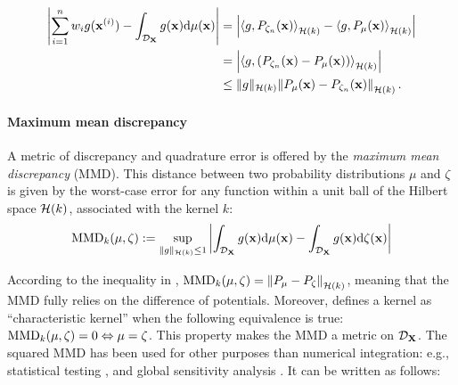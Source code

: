 \begin{subequations}
\begin{align}
    \left| \sum_{i=1}^{n} w_i g({\bf x}^{(i)}) - \int_{\mathcal{D}_{{\bf X}}} g({\bf x}) \mathrm{d} \mu({\bf x}) \right| &= \left| \left\langle g, P_{\zeta_n}({\bf x}) \right\rangle_{\mathcal{H}(k)} - \left\langle g, P_{\mu}({\bf x}) \right\rangle_{\mathcal{H}(k)} \right| \\
    &= \left| \left\langle g, \left(P_{\zeta_n}({\bf x}) - P_{\mu}({\bf x})\right) \right\rangle_{\mathcal{H}(k)} \right|\\
    &\leq \lVert g \lVert_{\mathcal{H}(k)}  \left\lVert P_{\mu}({\bf x}) - P_{\zeta_n}({\bf x}) \right\lVert_{\mathcal{H}(k)}.
    \label{eq:quad_error}
\end{align}
\end{subequations}

\paragraph{Maximum mean discrepancy}
A metric of discrepancy and quadrature error is offered by the \emph{maximum mean discrepancy} (MMD). 
This distance between two probability distributions $\mu$ and $\zeta$ is given by the worst-case error for any function within a unit ball of the Hilbert space $\mathcal{H}(k)$, associated with the kernel $k$:
\begin{equation}
    \MMD_k(\mu, \zeta) := %
    \sup_{\lVert g \lVert_{\iH(k)} \leq 1}
            \left | \int_{\iD_{\bX}} g(\bx) \dd \mu(\bx) - \int_{\iD_{\bX}} g(\bx) \dd \zeta(\bx) \right| %
    \label{eq:mmd}  
\end{equation}

According to the inequality in , $\mathrm{MMD}_k(\mu, \zeta) = \left\lVert P_{\mu} - P_{\zeta} \right\lVert_{\mathcal{H}(k)}$, meaning that the MMD fully relies on the difference of potentials. 
Moreover, \cite{sriperumbudur_2010} defines a kernel as ``characteristic kernel'' when the following equivalence is true: $\mathrm{MMD}_k(\mu, \zeta) = 0 \Leftrightarrow \mu = \zeta$. 
This property makes the MMD a metric on $\mathcal{D}_{{\bf X}}$. 
The squared MMD has been used for other purposes than numerical integration: e.g., statistical testing \citep{gretton_2006}, and global sensitivity analysis \citep{daveiga_2015}. 
It can be written as follows:

